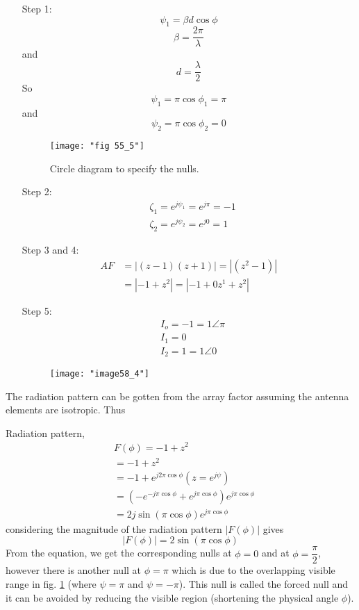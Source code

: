 	\begin{enumerate}
		\item[Step 1:] $$\psi_{1}=\beta d\cos\phi$$
					   $$\beta=\dfrac{2\pi}{\lambda}$$ and $$d=\dfrac{\lambda}{2}$$
					   So $$\psi_{1}=\pi\cos\phi_{1}=\pi$$
				   	   and $$\psi_{2}=\pi\cos\phi_{2}=0$$
				   	   \begin{figure}[H]
				   	   	\centering
				   	   	\texttt{[image: "fig 55\_5"]}
				   	   	\caption{Circle diagram to specify the nulls.}
				   	   	\label{fig:fig-55_5}
				   	   \end{figure}
			   	   
		\item[Step 2:] \begin{align*}
							&\zeta_1 = e^{j\psi_{1}}=e^{j\pi}=-1\\
							&\zeta_{2} = e^{j\psi_{2}}=e^{j0}=1
				       \end{align*}
				       
		\item[Step 3 and 4:]  \begin{align}
								AF &=|(z-1)(z+1)|=|(z^{2}-1)|\nonumber\\
								&=|-1+z^{2}|=|-1+0z^{1}+z^{2}|\nonumber	  
					    	  \end{align}
					    	  
		\item[Step 5:]  \begin{align*}
							&I_{o}=-1=1\angle\pi\\
							&I_{1}=0\\
							&I_{2}=1=1\angle0
					    \end{align*}
					    \begin{figure}[H]
					    	\centering
					    	\texttt{[image: "image58\_4"]}
					    	\label{fig:fig-55_6}
					    \end{figure}
	\end{enumerate}
			
	The radiation pattern can be gotten from the array factor assuming the antenna elements are isotropic. Thus
	
	Radiation pattern, \begin{align*}
	&F(\phi)=-1+z^{2}\\
	&=-1+z^{2}\\
	&=-1+e^{j2\pi\cos\phi} (z=e^{j\psi})\\
	&=(-e^{-j\pi\cos\phi} + e^{j\pi\cos\phi} )e^{j\pi\cos\phi}\\
	&=2j\sin(\pi\cos\phi)e^{j\pi\cos\phi}
	\end{align*}
	considering the magnitude of the radiation pattern $|F(\phi)|$ gives
	\begin{equation}
		|F(\phi)|= 2\sin(\pi\cos\phi)\label{eqn50}
	\end{equation}
	From the equation, we get the corresponding nulls at $\phi = 0$ and at $\phi = \dfrac{\pi}{2}$, however there is another null at $\phi =\pi$ which is due to the overlapping visible range in fig. \ref{fig:fig-55_5} (where $\psi = \pi$ and $\psi = -\pi$). This null is called the forced null and it can be avoided by reducing the visible region (shortening the physical angle $\phi$).
	\\
